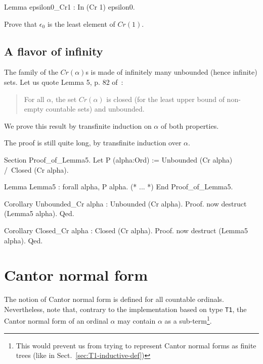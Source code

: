 {\begin{Coqsrc}
Lemma epsilon0_Cr1 : In (Cr 1) epsilon0.
\end{Coqsrc}


\begin{exercise}
 Prove that $\epsilon_0$ is the least element of $\textit{Cr}(1)$.
\end{exercise}


\subsection{A flavor of infinity}



The family of the $\textit{Cr}(\alpha)$s is made of infinitely many unbounded (hence infinite) sets.
Let us quote Lemma 5, p. 82  of~\cite{schutte}:
\begin{quote}
  For all $\alpha$, the set $\textit{Cr}(\alpha)$ is closed (for the least upper bound of non-empty countable sets) and unbounded.
\end{quote}

We prove this result by transfinite induction on $\alpha$ of both properties.

The proof is still quite long, by transfinite induction over $\alpha$.


\begin{Coqsrc}
Section Proof_of_Lemma5.
  Let P (alpha:Ord) := Unbounded (Cr alpha) /\ Closed (Cr alpha).
 
 Lemma Lemma5 : forall alpha, P alpha.
(* ... *)
 End Proof_of_Lemma5.

Corollary Unbounded_Cr alpha : Unbounded (Cr alpha).
Proof.
  now destruct (Lemma5 alpha).
Qed.

Corollary Closed_Cr alpha : Closed (Cr alpha).
Proof.
  now destruct (Lemma5 alpha).
Qed.
\end{Coqsrc}

\section{Cantor normal form}

The notion of Cantor normal form is defined for all countable ordinals.
Nevertheless, note that, contrary to the implementation based on type \texttt{T1},
the Cantor normal form of an ordinal $\alpha$ may contain $\alpha$ as a 
sub-term\footnote{This would prevent us from trying to represent Cantor normal forms as finite trees (like in Sect.~\ref{sec:T1-inductive-def})}.


}
